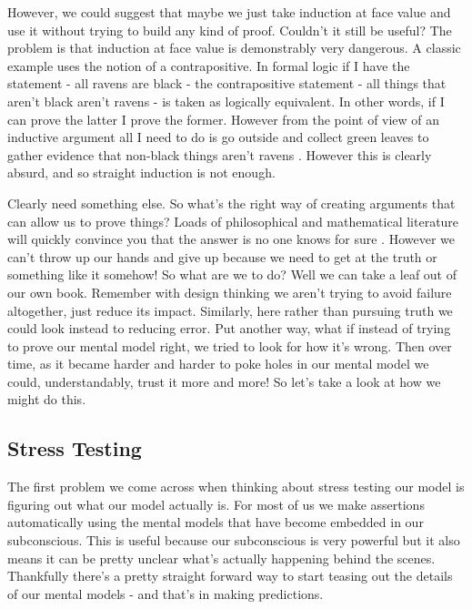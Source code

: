 \documentclass[11pt,a5paper]{book}
\begin{document}
However, we could suggest that maybe we just take induction at face value and use it without trying to build any kind of proof. Couldn't it still be useful? The problem is that induction at face value is demonstrably very dangerous. A classic example uses the notion of a contrapositive. In formal logic if I have the statement - all ravens are black - the contrapositive statement - all things that aren't black aren't ravens - is taken as logically equivalent. In other words, if I can prove the latter I prove the former. However from the point of view of an inductive argument all I need to do is go outside and collect green leaves to gather evidence that non-black things aren't ravens \cite{lipton}. However this is clearly absurd, and so straight induction is not enough. 
\newline

Clearly need something else. So what's the right way of creating arguments that can allow us to prove things? Loads of philosophical and mathematical literature will quickly convince you that the answer is no one knows for sure \cite{lipton} \cite{tkuhn}. However we can't throw up our hands and give up because we need to get at the truth or something like it somehow! So what are we to do? Well we can take a leaf out of our own book. Remember with design thinking we aren't trying to avoid failure altogether, just reduce its impact. Similarly, here rather than pursuing truth we could look instead to reducing error. Put another way, what if instead of trying to prove our mental model right, we tried to look for how it's wrong. Then over time, as it became harder and harder to poke holes in our mental model we could, understandably, trust it more and more! So let's take a look at how we might do this. 

\subsection{Stress Testing}
The first problem we come across when thinking about stress testing our model is figuring out what our model actually is. For most of us we make assertions automatically using the mental models that have become embedded in our subconscious. This is useful because our subconscious is very powerful \cite{newport} but it also means it can be pretty unclear what's actually happening behind the scenes. Thankfully there's a pretty straight forward way to start teasing out the details of our mental models - and that's in making predictions. 
\newline
\end{document}
